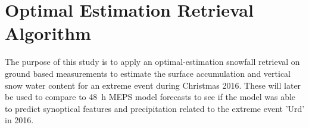 \section{Optimal Estimation Retrieval Algorithm} %
\label{sec:retrieval}
The purpose of this study is to apply an optimal-estimation snowfall retrieval on ground based measurements to estimate the surface accumulation and vertical snow water content for an extreme event during Christmas 2016. These will later be used to compare to \SI{48}{\hour} MEPS model forecasts to see if the model was able to predict synoptical features and precipitation related to the extreme event 'Urd' in 2016. 
